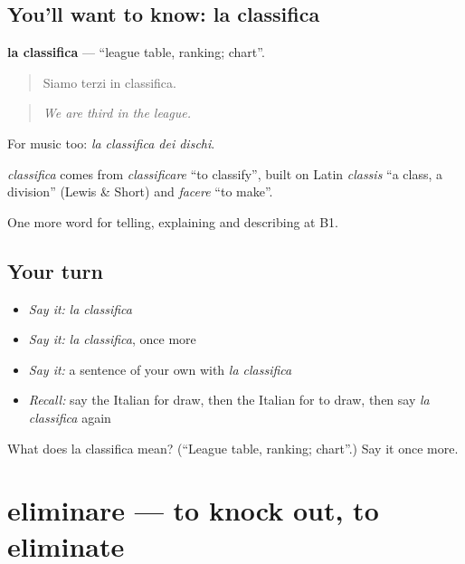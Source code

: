 \subsection*{You'll want to know: la classifica}
\textbf{la classifica} — \textquotedblleft{}league table, ranking; chart\textquotedblright{}.

\begin{quote}
Siamo terzi in classifica.
\end{quote}

\begin{quote}
\emph{We are third in the league.}
\end{quote}

For music too: \emph{la classifica dei dischi}.

\begin{cousinweb}
\emph{classifica} comes from \emph{classificare} \textquotedblleft{}to classify\textquotedblright{}, built on Latin \emph{classis} \textquotedblleft{}a class, a division\textquotedblright{} (Lewis \& Short) and \emph{facere} \textquotedblleft{}to make\textquotedblright{}.
\end{cousinweb}

\begin{grammarlens}[title={What you've built}]
One more word for telling, explaining and describing at B1.
\end{grammarlens}

\subsection*{Your turn}
\begin{itemize}
\raggedright
  \item \emph{Say it:} \emph{la classifica}
  \item \emph{Say it:} \emph{la classifica}, once more
  \item \emph{Say it:} a sentence of your own with \emph{la classifica}
  \item \emph{Recall:} say the Italian for draw, then the Italian for to draw, then say \emph{la classifica} again
\end{itemize}

\begin{tcolorbox}[breakable,colback=teal!4,colframe=teal!35!black,title={Before you move on}]
What does la classifica mean? (\textquotedblleft{}League table, ranking; chart\textquotedblright{}.) Say it once more.
\end{tcolorbox}
\section[eliminare]{eliminare — to knock out, to eliminate}

